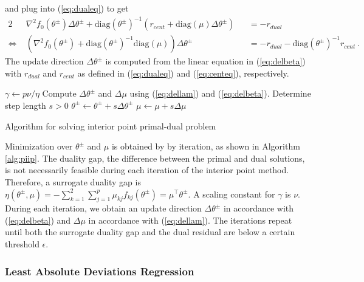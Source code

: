 \documentclass[11pt]{article}
\begin{document}
and plug into (\ref{eq:dualeq}) to get
\begin{alignat}{2}
&\nabla^2f_0(\theta^{\pm}) \Delta\theta^{\pm} + \text{diag}(\theta^{\pm})^{-1} \left( r_{cent} + \text{diag}(\mu)\Delta\theta^{\pm} \right) &&= -r_{dual}\nonumber\\ 
\Leftrightarrow \; &\left(\nabla^2f_0(\theta^{\pm}) + \text{diag}(\theta^{\pm})^{-1} \text{diag}(\mu) \right)\Delta\theta^{\pm} &&= -r_{dual} - \text{diag}(\theta^{\pm})^{-1} r_{cent}\,.\label{eq:delbeta}
\end{alignat}
The update direction $\Delta\theta^{\pm}$ is computed from the linear equation in (\ref{eq:delbeta}) with $r_{dual}$ and $r_{cent}$ as defined in (\ref{eq:dualeq}) and (\ref{eq:centeq}), respectively.

\begin{algorithm}\begingroup\fontsize{10}{10}\selectfont
\begin{algorithmic}
\State
{}
	\State $\gamma \gets p\nu/\eta$
	\State Compute $\Delta\theta^{\pm}$ and $\Delta\mu$ using (\ref{eq:dellam}) and (\ref{eq:delbeta}).
	\State Determine step length $s>0$
	\State $\theta^{\pm} \gets \theta^{\pm} + s\Delta\theta^{\pm}$
	\State $\mu \gets \mu + s\Delta\mu$
\EndWhile
\end{algorithmic}\endgroup\caption{Algorithm for solving interior point primal-dual problem}\label{alg:piip}
\end{algorithm} 

Minimization over $\theta^{\pm}$ and $\mu$ is obtained by by iteration, as shown in Algorithm \ref{alg:piip}. The duality gap, the difference between the primal and dual solutions, is not necessarily feasible during each iteration of the interior point method. Therefore, a surrogate duality gap is $\eta(\theta^{\pm}, \mu) = -\sum_{k=1}^2 \sum_{j=1}^p \mu_{kj} f_{kj}(\theta^{\pm})  = \mu^{\top} \theta^{\pm}$. A scaling constant for $\gamma$ is $\nu$. During each iteration, we obtain an update direction $\Delta\theta^{\pm}$ in accordance with (\ref{eq:delbeta}) and $\Delta\mu$ in accordance with (\ref{eq:dellam}). The iterations repeat until both the surrogate duality gap and the dual residual are below a certain threshold $\epsilon$.

\subsubsection{Least Absolute Deviations Regression} \label{sec:lad}
\end{document}
